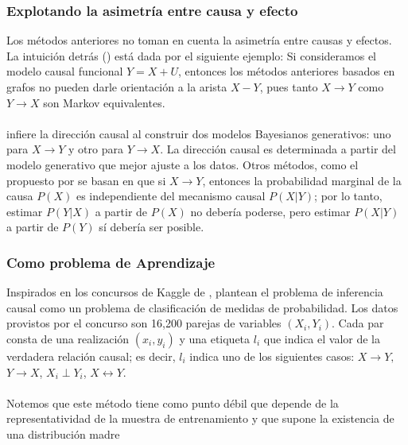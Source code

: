 \documentclass[11pt]{article}
\theoremstyle{plain}
\begin{document}
\subsubsection{Explotando la asimetría entre causa y efecto}
Los métodos anteriores no toman en cuenta la asimetría entre causas y efectos. La intuición detrás (\cite{goudet2017learning}) está dada por el siguiente ejemplo: Si consideramos el modelo causal funcional $Y=X+U$, entonces los métodos anteriores basados en grafos no pueden darle orientación a la arista $X - Y$, pues tanto $X \rightarrow Y$ como $Y \rightarrow X$ son Markov equivalentes.\\
\\
\cite{stegle2010probabilistic} infiere la dirección causal al construir dos modelos Bayesianos generativos: uno para $X \rightarrow Y$ y otro para $Y \rightarrow X$. La dirección causal es determinada a partir del modelo generativo que mejor ajuste a los datos. Otros métodos, como el propuesto por \cite{sgouritsa2015inference} se basan en que si $X \rightarrow Y$, entonces la probabilidad marginal de la causa $P(X)$ es independiente del mecanismo causal $P(X | Y)$; por lo tanto, estimar $P(Y | X)$ a partir de $P(X)$ no debería poderse, pero estimar $P(X | Y)$ a partir de $P(Y)$ sí debería ser posible.
\subsubsection{Como problema de Aprendizaje}
Inspirados en los concursos de Kaggle de \cite{Guyon2013}, \cite{lopez2015towards} plantean el problema de inferencia causal como un problema de clasificación de medidas de probabilidad. Los datos provistos por el concurso son 16,200 parejas de variables $(X_i,Y_i)$. Cada par consta de una realización $(x_i,y_i)$ y una etiqueta $l_i$ que indica el valor de la verdadera relación causal; es decir, $l_i$ indica uno de los siguientes casos: $X \rightarrow Y,$ $Y \rightarrow X$, $X_i \perp Y_i$, $X \leftrightarrow Y$.\\
\\
Notemos que este método tiene como punto débil que depende de la representatividad de la muestra de entrenamiento y que supone la existencia de una distribución madre
\end{document}
